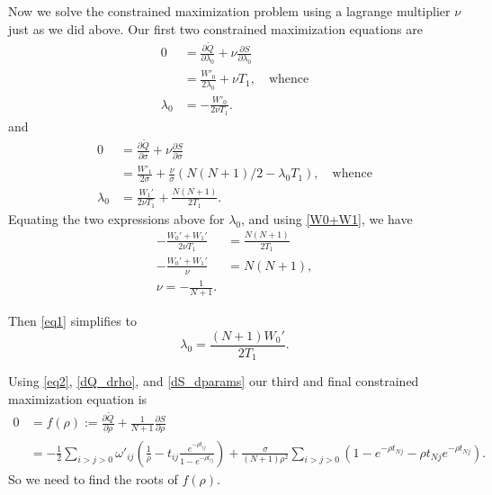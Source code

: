 \documentclass[12pt,leqno]{article}
\begin{document}
Now we solve the constrained maximization problem using a lagrange multiplier $\nu$ just as we did above.
Our first two constrained maximization equations are
\begin{equation}\label{eq1}
  \begin{split}
    0 &= \frac{\partial\tilde{Q}}{\partial\lambda_0} + \nu\frac{\partial{S}}{\partial\lambda_0} \\
    &=  \frac{W'_0}{2\lambda_0} + {\nu}T_1,\quad\text{whence}\\
    \lambda_0 &= -\frac{W'_0}{2\nu T_1}.
  \end{split}
\end{equation}
and
\begin{align*}
  0 &= \frac{\partial\tilde{Q}}{\partial\sigma} + \nu\frac{\partial{S}}{\partial\sigma} \\
  &= \frac{W'_1}{2\sigma} + \frac{\nu}{\sigma}(N(N+1)/2 - \lambda_0T_1),\quad\text{whence}\\
  \lambda_0 &= \frac{W_1'}{2\nu T_1} + \frac{N(N+1)}{2T_1}.
\end{align*}
Equating the two expressions above for $\lambda_0$, and using \eqref{W0+W1}, we have
\begin{equation}\label{eq2}
  \begin{split}
    -\frac{W_0'+W_1'}{2\nu T_1} &= \frac{N(N+1)}{2T_1} \\
    -\frac{W_0'+W_1'}{\nu} &= N(N+1), \\
    \nu = -\frac{1}{N+1}.
  \end{split}
\end{equation}

Then \eqref{eq1} simplifies to
\begin{equation} \label{lambda0:1}
    \lambda_0 = \frac{(N+1)W_0'}{2T_1}.
\end{equation}

Using \eqref{eq2}, \eqref{dQ_drho}, and \eqref{dS_dparams} our third and final constrained maximization
equation is
\begin{align*}
  0 &= f(\rho) := \frac{\partial\tilde{Q}}{\partial\rho} + \frac{1}{N+1}\frac{\partial{S}}{\partial\rho} \\
  &= -\frac{1}{2}\sum_{i>j>0}\omega'_{ij}\left(\frac{1}{\rho} - t_{ij}\frac{e^{-\rho{t_{ij}}}}{1-e^{-\rho t_{ij}}}\right)
  +\frac{\sigma}{(N+1)\rho^2}\sum_{i>j>0}\left(1 - e^{-\rho{t_{Nj}}} - \rho t_{Nj}e^{-\rho t_{Nj}}\right).
\end{align*}
So we need to find the roots of $f(\rho)$.
\end{document}
